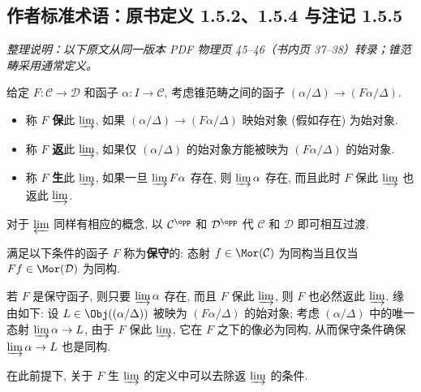 \subsection*{作者标准术语：原书定义 1.5.2、1.5.4 与注记 1.5.5}
\noindent\textit{整理说明：以下原文从同一版本 PDF 物理页 45--46（书内页 37--38）转录；锥范畴采用通常定义。}
\par\medskip
\def\CorpusNumber{1.5.2}\begin{definition}\label{def:create-limit}
给定 $F: \mathcal{C}\to\mathcal{D}$ 和函子 $\alpha:I\to\mathcal{C}$, 考虑锥范畴之间的函子 $(\alpha/\Delta)\to(F\alpha/\Delta)$.
\begin{itemize}
\item 称 $F$ \textbf{保}此 $\varinjlim$, 如果 $(\alpha/\Delta)\to(F\alpha/\Delta)$ 映始对象 (假如存在) 为始对象.
\item 称 $F$ \textbf{返}此 $\varinjlim$, 如果仅 $(\alpha/\Delta)$ 的始对象方能被映为 $(F\alpha/\Delta)$ 的始对象.
\item 称 $F$ \textbf{生}此 $\varinjlim$, 如果一旦 $\varinjlim F\alpha$ 存在, 则 $\varinjlim\alpha$ 存在, 而且此时 $F$ 保此 $\varinjlim$ 也返此 $\varinjlim$.
\end{itemize}
对于 $\varprojlim$ 同样有相应的概念, 以 $\mathcal{C}^{\opp}$ 和 $\mathcal{D}^{\opp}$ 代 $\mathcal{C}$ 和 $\mathcal{D}$ 即可相互过渡.
\end{definition}
\def\CorpusNumber{1.5.4}\begin{definition}\label{def:conservative}
满足以下条件的函子 $F$ 称为\textbf{保守}的: 态射 $f\in\Mor(\mathcal{C})$ 为同构当且仅当 $Ff\in\Mor(\mathcal{D})$ 为同构.
\end{definition}
\def\CorpusNumber{1.5.5}\begin{remark}\label{rem:conservative-reflect}
若 $F$ 是保守函子, 则只要 $\varinjlim\alpha$ 存在, 而且 $F$ 保此 $\varinjlim$, 则 $F$ 也必然返此 $\varinjlim$. 缘由如下: 设 $L\in\Obj((\alpha/\Delta))$ 被映为 $(F\alpha/\Delta)$ 的始对象; 考虑 $(\alpha/\Delta)$ 中的唯一态射 $\varinjlim\alpha\to L$, 由于 $F$ 保此 $\varinjlim$, 它在 $F$ 之下的像必为同构, 从而保守条件确保 $\varinjlim\alpha\to L$ 也是同构.

在此前提下, 关于 $F$ 生 $\varinjlim$ 的定义中可以去除返 $\varinjlim$ 的条件.
\end{remark}
